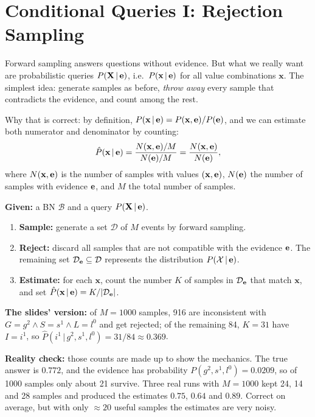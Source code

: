 \documentclass[11pt, oneside]{book}
\newcommand{\Prob}{\mathbb{P}}           %
\newcommand{\dataset}{\mathcal{D}}       %
\newcommand{\given}{\,\vert\,}           %
\newcommand{\Xall}{\mathcal{X}}          %
\newcommand{\bX}{\mathbf{X}}  \newcommand{\bY}{\mathbf{Y}}
\newcommand{\bx}{\mathbf{x}}  \newcommand{\by}{\mathbf{y}}
\let\originalsection\section
\renewcommand{\section}{\Needspace{7\baselineskip}\originalsection}
\begin{document}
\section{Conditional Queries I: Rejection Sampling}
\label{sec:rejection}

Forward sampling answers questions without evidence. But what we really want
are probabilistic queries $P(\bX \given \be)$, i.e.\ $P(\bx \given \be)$ for all
value combinations $\bx$. The simplest idea: generate samples as before,
\emph{throw away} every sample that contradicts the evidence, and count among
the rest.

Why that is correct: by definition, $P(\bx \given \be) = P(\bx, \be) /
P(\be)$, and we can estimate both numerator and denominator by counting:
\[
\hat P(\bx \given \be) = \frac{N(\bx, \be)/M}{N(\be)/M} = \frac{N(\bx, \be)}{N(\be)},
\]
where $N(\bx, \be)$ is the number of samples with values $(\bx, \be)$, $N(\mathbf{e})$
the number of samples with evidence $\mathbf{e}$, and $M$ the total number of samples.

\begin{thmbox}[title={Rejection sampling}, unbreakable]
\textbf{Given:} a BN $\mathcal{B}$ and a query $P(\bX \given \be)$.
\begin{enumerate}
  \item \textbf{Sample:} generate a set $\dataset$ of $M$ events by forward
    sampling.
  \item \textbf{Reject:} discard all samples that are not compatible with the
    evidence $\mathbf{e}$. The remaining set $\dataset_{\be} \subseteq \dataset$
    represents the distribution $P(\Xall \given \be)$.
  \item \textbf{Estimate:} for each $\bx$, count the number $K$ of samples in
    $\dataset_{\be}$ that match $\bx$, and set $\hat P(\bx \given \be) = K /
    |\dataset_{\be}|$.
\end{enumerate}
\end{thmbox}

\begin{exbox}[title={Rejection sampling for $P(i^1 \given g^2, s^1, l^0)$}]
\textbf{The slides' version:} of $M = 1000$ samples, 916 are inconsistent
with $G = g^2 \wedge S = s^1 \wedge L = l^0$ and get rejected; of the remaining
84, $K = 31$ have $I = i^1$, so $\hat P(i^1 \given g^2, s^1, l^0) = 31/84
\approx 0.369$.\par\smallskip
\textbf{Reality check:} those counts are made up to show the mechanics. The
true answer is $0.772$, and the evidence has probability $P(g^2, s^1, l^0) =
0.0209$, so of 1000 samples only about 21 survive. Three real runs with
$M = 1000$ kept 24, 14 and 28 samples and produced the estimates $0.75$,
$0.64$ and $0.89$. Correct on average, but with only $\approx 20$ useful
samples the estimates are very noisy.
\end{exbox}
\end{document}
